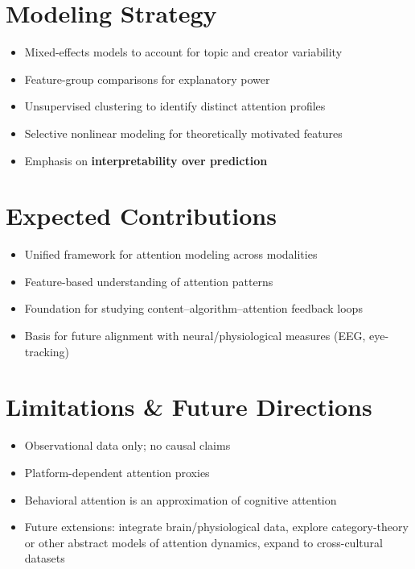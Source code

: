 \documentclass[11pt,a4paper]{article}
\begin{document}
\section*{Modeling Strategy}
\begin{itemize}[leftmargin=*]
    \item Mixed-effects models to account for topic and creator variability
    \item Feature-group comparisons for explanatory power
    \item Unsupervised clustering to identify distinct attention profiles
    \item Selective nonlinear modeling for theoretically motivated features
    \item Emphasis on \textbf{interpretability over prediction}
\end{itemize}

\section*{Expected Contributions}
\begin{itemize}[leftmargin=*]
    \item Unified framework for attention modeling across modalities
    \item Feature-based understanding of attention patterns
    \item Foundation for studying content–algorithm–attention feedback loops
    \item Basis for future alignment with neural/physiological measures (EEG, eye-tracking)
\end{itemize}

\section*{Limitations \& Future Directions}
\begin{itemize}[leftmargin=*]
    \item Observational data only; no causal claims
    \item Platform-dependent attention proxies
    \item Behavioral attention is an approximation of cognitive attention
    \item Future extensions: integrate brain/physiological data, explore category-theory or other abstract models of attention dynamics, expand to cross-cultural datasets
\end{itemize}
\end{document}
